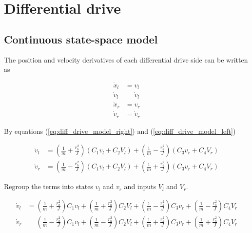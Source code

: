 \section{Differential drive}
\label{sec:ss_model_differential_drive}

\subsection{Continuous state-space model}

The position and velocity derivatives of each differential drive side can be
written as

\begin{align}
  \dot{x}_l &= v_l \label{eq:diff_drive_cont_ss_posl} \\
  \dot{v}_l &= \dot{v}_l \label{eq:diff_drive_cont_ss_vell} \\
  \dot{x}_r &= v_r \label{eq:diff_drive_cont_ss_posr} \\
  \dot{v}_r &= \dot{v}_r \label{eq:diff_drive_cont_ss_velr}
\end{align}

By equations (\ref{eq:diff_drive_model_right}) and
(\ref{eq:diff_drive_model_left})

\begin{align*}
  \dot{v}_l &= \left(\frac{1}{m} + \frac{r_b^2}{J}\right)
    \left(C_1 v_l + C_2 V_l\right) +
    \left(\frac{1}{m} - \frac{r_b^2}{J}\right) \left(C_3 v_r + C_4 V_r\right) \\
  \dot{v}_r &= \left(\frac{1}{m} - \frac{r_b^2}{J}\right)
    \left(C_1 v_l + C_2 V_l\right) +
    \left(\frac{1}{m} + \frac{r_b^2}{J}\right) \left(C_3 v_r + C_4 V_r\right)
\end{align*}

Regroup the terms into states $v_l$ and $v_r$ and inputs $V_l$ and $V_r$.

\begin{align*}
  \dot{v}_l &= \left(\frac{1}{m} + \frac{r_b^2}{J}\right) C_1 v_l +
    \left(\frac{1}{m} + \frac{r_b^2}{J}\right) C_2 V_l +
    \left(\frac{1}{m} - \frac{r_b^2}{J}\right) C_3 v_r +
    \left(\frac{1}{m} - \frac{r_b^2}{J}\right) C_4 V_r \\
  \dot{v}_r &= \left(\frac{1}{m} - \frac{r_b^2}{J}\right) C_1 v_l +
    \left(\frac{1}{m} - \frac{r_b^2}{J}\right) C_2 V_l +
    \left(\frac{1}{m} + \frac{r_b^2}{J}\right) C_3 v_r +
    \left(\frac{1}{m} + \frac{r_b^2}{J}\right) C_4 V_r
\end{align*}


